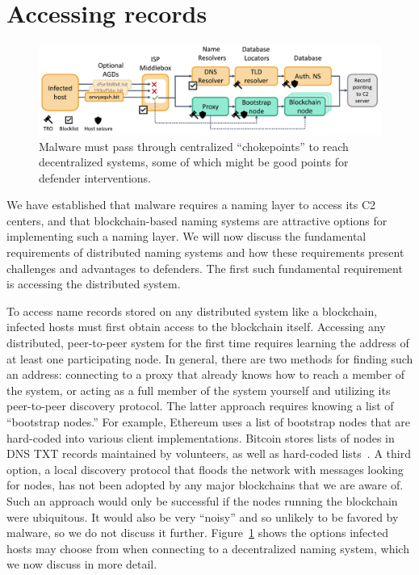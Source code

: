 \section{Accessing records}
\label{sec:accessing_records}

\begin{figure}[t]
	\centering
	\includegraphics[width=\textwidth]{figs/intervention_locations.pdf}
	\caption{Malware must pass through centralized ``chokepoints'' to reach 
		decentralized systems, some of which might be good points for defender 
		interventions.}
	\label{fig:malware_contacting_cnc}
\end{figure}

We have established that malware requires a naming layer to access its C2 
centers, and 
that blockchain-based naming systems are attractive options for implementing 
such a naming layer. 
We will now discuss the fundamental requirements of distributed naming systems 
and how 
these requirements present challenges and advantages to defenders. The first 
such fundamental 
requirement is accessing the distributed system.

To access name records stored on any distributed system like a blockchain, 
infected hosts must 
first obtain access to the blockchain itself. Accessing any distributed, 
peer-to-peer system for 
the first time requires learning the address of at least one participating 
node. In general, there 
are two methods for finding such an address: connecting to a 
proxy that already knows how to reach a member of the system, or acting 
as a full member of the system yourself and utilizing its peer-to-peer 
discovery protocol. The 
latter approach requires knowing a list of ``bootstrap nodes.'' For example, 
Ethereum uses a list 
of bootstrap nodes that are hard-coded into various client 
implementations. Bitcoin 
stores lists of nodes in DNS TXT records maintained by volunteers, as well 
as hard-coded 
lists~\cite{citation_needed}. A third option, a 
local discovery protocol that floods the network with 
messages looking for nodes, has not been adopted by any major 
blockchains that we are aware of. Such an approach would only be successful if 
the nodes running 
the blockchain were ubiquitous. It would also be very ``noisy'' and so 
unlikely to be favored by 
malware, so we do not discuss it further. 
Figure~\ref{fig:malware_contacting_cnc} shows the options 
infected hosts may choose from when connecting to a decentralized naming 
system, which we now 
discuss in more detail.

